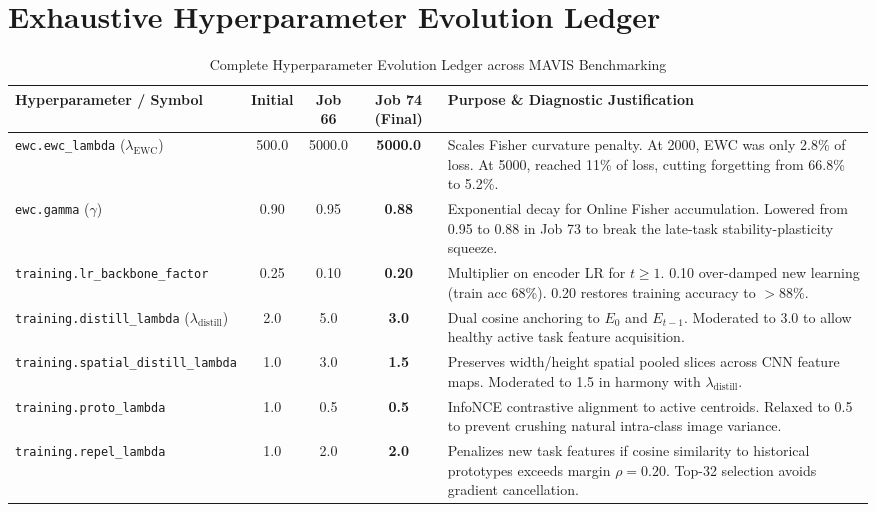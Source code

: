 \documentclass[11pt,a4paper]{article}
\begin{document}
\newpage

\section{Exhaustive Hyperparameter Evolution Ledger}
\label{sec:hyperparameter-ledger}

\begin{table}[h!]
\centering
\scriptsize
\renewcommand{\arraystretch}{1.25}
\caption{Complete Hyperparameter Evolution Ledger across MAVIS Benchmarking}
\label{tab:hyperparameters-master}
\begin{tabularx}{\textwidth}{p{3.2cm} c c c p{6.8cm}}
\toprule
\textbf{Hyperparameter / Symbol} & \textbf{Initial} & \textbf{Job 66} & \textbf{Job 74 (Final)} & \textbf{Purpose \& Diagnostic Justification} \\
\midrule
\texttt{ewc.ewc\_lambda} ($\lambda_{\text{EWC}}$) & 500.0 & 5000.0 & \textbf{5000.0} & Scales Fisher curvature penalty. At 2000, EWC was only 2.8\% of loss. At 5000, reached 11\% of loss, cutting forgetting from 66.8\% to 5.2\%. \\
\texttt{ewc.gamma} ($\gamma$) & 0.90 & 0.95 & \textbf{0.88} & Exponential decay for Online Fisher accumulation. Lowered from 0.95 to 0.88 in Job 73 to break the late-task stability-plasticity squeeze. \\
\texttt{training.lr\_backbone\_factor} & 0.25 & 0.10 & \textbf{0.20} & Multiplier on encoder LR for $t \ge 1$. 0.10 over-damped new learning (train acc 68\%). 0.20 restores training accuracy to $>88\%$. \\
\texttt{training.distill\_lambda} ($\lambda_{\text{distill}}$) & 2.0 & 5.0 & \textbf{3.0} & Dual cosine anchoring to $E_0$ and $E_{t-1}$. Moderated to 3.0 to allow healthy active task feature acquisition. \\
\texttt{training.spatial\_distill\_lambda} & 1.0 & 3.0 & \textbf{1.5} & Preserves width/height spatial pooled slices across CNN feature maps. Moderated to 1.5 in harmony with $\lambda_{\text{distill}}$. \\
\texttt{training.proto\_lambda} & 1.0 & 0.5 & \textbf{0.5} & InfoNCE contrastive alignment to active centroids. Relaxed to 0.5 to prevent crushing natural intra-class image variance. \\
\texttt{training.repel\_lambda} & 1.0 & 2.0 & \textbf{2.0} & Penalizes new task features if cosine similarity to historical prototypes exceeds margin $\rho=0.20$. Top-32 selection avoids gradient cancellation. \\

\end{tabularx}
\end{table}
\end{document}
